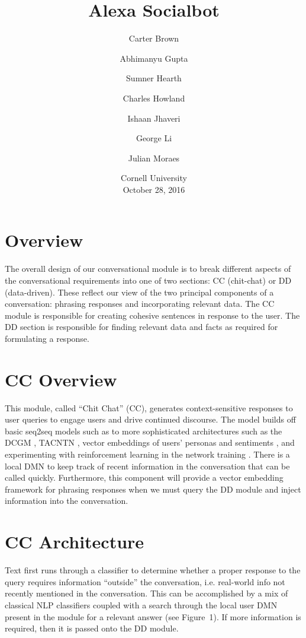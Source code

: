 \documentclass[10pt,twoside,twocolumn]{article}
\title{Alexa Socialbot}
\author{Carter Brown \and Abhimanyu Gupta \and Sumner Hearth \and Charles Howland \and Ishaan Jhaveri \and George Li \and Julian Moraes}
\date{%
    Cornell University\\%
    October 28, 2016\\%
}%
\begin{document}
\maketitle

\section{Overview}
The overall design of our conversational module is to break different aspects of the conversational requirements into one of two sections: CC (chit-chat) or DD (data-driven). These reflect our view of the two principal components of a conversation: phrasing responses and incorporating relevant data. The CC module is responsible for creating cohesive sentences in response to the user. The DD section is responsible for finding relevant data and facts as required for formulating a response.

\section{CC Overview}
This module, called ``Chit Chat'' (CC), generates context-sensitive responses to user queries to engage users and drive continued discourse. The model builds off basic seq2seq models such as \cite{Vinyals2015} to more sophisticated architectures such as the DCGM \cite{Sordoni2015}, TACNTN \cite{Wu}, vector embeddings of users' personas and sentiments \cite{Li2016a}, and experimenting with reinforcement learning in the network training \cite{Zaremba2015, Williams2016, Li2016b}. There is a local DMN \cite{Kumar:2015, Xiong2016} to keep track of recent information in the conversation that can be called quickly. Furthermore, this component will provide a vector embedding framework for phrasing responses when we must query the DD module and inject information into the conversation.

\section{CC Architecture}

Text first runs through a classifier to determine whether a proper response to the query requires information ``outside'' the conversation, i.e. real-world info not recently mentioned in the conversation. This can be accomplished by a mix of classical NLP classifiers coupled with a search through the local user DMN present in the module for a relevant answer (see Figure~1). If more information is required, then it is passed onto the DD module.
\end{document}
